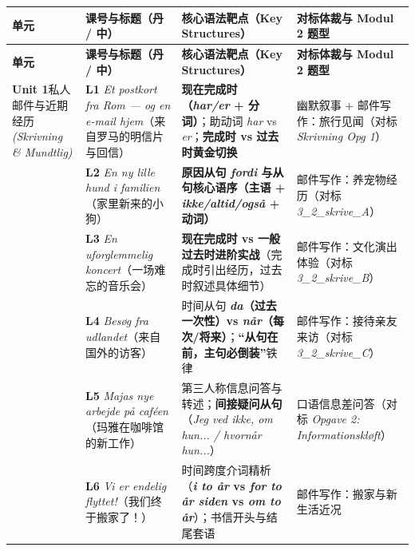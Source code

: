 \documentclass[10.5pt, a4paper]{ctexart}
\begin{document}
{\small
\renewcommand{\arraystretch}{1.28}
\begin{longtable}{@{} >{\raggedright\arraybackslash}p{2.65cm} >{\raggedright\arraybackslash}p{4.6cm} >{\raggedright\arraybackslash}p{5.15cm} >{\raggedright\arraybackslash}p{3.2cm} @{}}
\toprule
\textbf{单元} & \textbf{课号与标题（丹 / 中）} & \textbf{核心语法靶点（Key Structures）} & \textbf{对标体裁与 Modul 2 题型} \\
\midrule
\endfirsthead
\toprule
\textbf{单元} & \textbf{课号与标题（丹 / 中）} & \textbf{核心语法靶点（Key Structures）} & \textbf{对标体裁与 Modul 2 题型} \\
\midrule
\endhead
\bottomrule
\endfoot
\textbf{Unit 1}\newline 私人邮件与\newline 近期经历\newline \textit{(Skrivning \& Mundtlig)} & \textbf{L1} \textit{Et postkort fra Rom — og en e-mail hjem}\newline （来自罗马的明信片与回信） & \textbf{现在完成时（\textit{har/er} + 分词）}；助动词 \textit{har} vs \textit{er}；\textbf{完成时 vs 过去时黄金切换} & 幽默叙事 + 邮件写作：旅行见闻（对标 \textit{Skrivning Opg 1}） \\
 & \textbf{L2} \textit{En ny lille hund i familien}\newline （家里新来的小狗） & \textbf{原因从句 \textit{fordi} 与从句核心语序（主语 + \textit{ikke/altid/også} + 动词）} & 邮件写作：养宠物经历（对标 \textit{3\_2\_skrive\_A}） \\
 & \textbf{L3} \textit{En uforglemmelig koncert}\newline （一场难忘的音乐会） & \textbf{现在完成时 vs 一般过去时进阶实战}（完成时引出经历，过去时叙述具体细节） & 邮件写作：文化演出体验（对标 \textit{3\_2\_skrive\_B}） \\
 & \textbf{L4} \textit{Besøg fra udlandet}\newline （来自国外的访客） & 时间从句 \textbf{\textit{da}（过去一次性）vs \textit{når}（每次/将来）}；\textbf{“从句在前，主句必倒装”}铁律 & 邮件写作：接待亲友来访（对标 \textit{3\_2\_skrive\_C}） \\
 & \textbf{L5} \textit{Majas nye arbejde på caféen}\newline （玛雅在咖啡馆的新工作） & 第三人称信息问答与转述；\textbf{间接疑问从句}（\textit{Jeg ved ikke, om hun... / hvornår hun...}） & 口语信息差问答（对标 \textit{Opgave 2: Informationskløft}） \\
 & \textbf{L6} \textit{Vi er endelig flyttet!}\newline （我们终于搬家了！） & 时间跨度介词精析（\textbf{\textit{i to år} vs \textit{for to år siden} vs \textit{om to år}}）；书信开头与结尾套语 & 邮件写作：搬家与新生活近况 \\

\end{longtable}}
\end{document}
